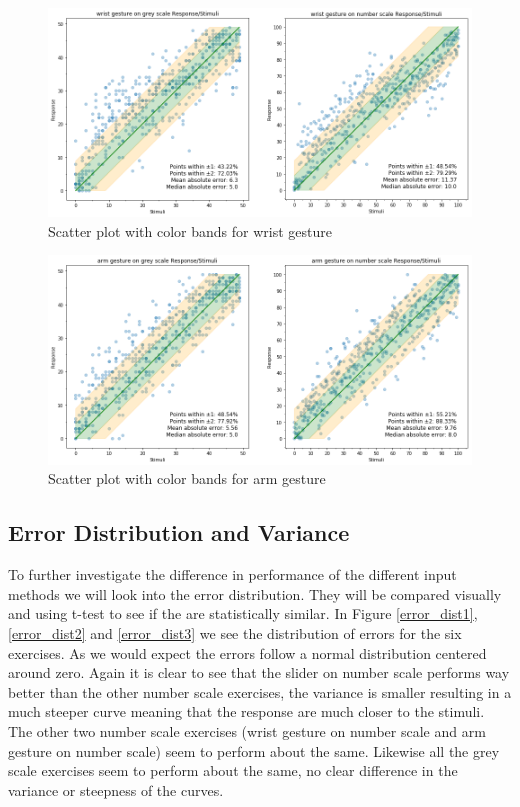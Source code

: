 \begin{figure}[p]
    \centering
    \includegraphics[width=1.15\textwidth]{figures/scatter_col2.png}
    \caption{Scatter plot with color bands for wrist gesture}
    \label{scatter_color2}
\end{figure}

\begin{figure}[p]
    \centering
    \includegraphics[width=1.15\textwidth]{figures/scatter_col3.png}
    \caption{Scatter plot with color bands for arm gesture}
    \label{scatter_color3}
\end{figure}

\subsection{Error Distribution and Variance}
To further investigate the difference in performance of the different input methods we will look into the error distribution. They will be compared visually and using t-test to see if the are statistically similar. In Figure \ref{error_dist1}, \ref{error_dist2} and \ref{error_dist3} we see the distribution of errors for the six exercises. As we would expect the errors follow a normal distribution centered around zero. Again it is clear to see that the slider on number scale performs way better than the other number scale exercises, the variance is smaller resulting in a much steeper curve meaning that the response are much closer to the stimuli. The other two number scale exercises (wrist gesture on number scale and arm gesture on number scale) seem to perform about the same. Likewise all the grey scale exercises seem to perform about the same, no clear difference in the variance or steepness of the curves.

